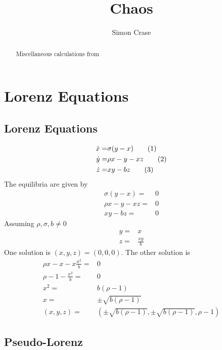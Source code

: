 \documentclass[]{article}
\title{Chaos}
\author{Simon Crase}
\newcommand\numberthis{\addtocounter{equation}{1}\tag{\theequation}}
\begin{document}
\maketitle

\begin{abstract}
Miscellaneous calculations  from \cite{ChaosBook}
\end{abstract}

\tableofcontents

\section{Lorenz Equations}

\subsection{Lorenz Equations}
\begin{align*}
	\dot{x} =& \sigma(y-x) \numberthis \label{eq:lorenz:1}\\
	\dot{y} =& \rho x -y - xz \numberthis \label{eq:lorenz:2}\\
	\dot{z} =& xy-bz \numberthis \label{eq:lorenz:3}
\end{align*}
The equilibria are given by
\begin{align*}
	\sigma(y-x) =& 0\\
	\rho x -y - xz  =& 0\\
	xy-bz =& 0
\end{align*}
Assuming $\rho, \sigma, b \ne 0$
\begin{align*}
	y =& x\\
	z =& \frac{xy}{b}
\end{align*}
One solution is $(x,y,z)= (0,0,0)$. The other solution is
\begin{align*}
	\rho x - x-x \frac{x^2}{b} =& 0\\
	\rho -1 - \frac {x^2}{b} =& 0\\
	x^2 =& b(\rho-1)\\
	x =& \pm \sqrt{ b(\rho-1)}\\
	(x,y,z)=& (\pm \sqrt{ b(\rho-1)},\pm \sqrt{ b(\rho-1)},\rho-1)
\end{align*}

\subsection{Pseudo-Lorenz}
\end{document}
